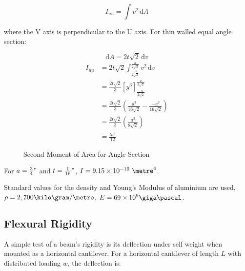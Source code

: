 \documentclass[12pt]{article} %
\begin{document}
\begin{appendices}
$$ I_{uu} = \int \! v^2 \, \mathrm{d}A $$

where the V axis is perpendicular to the U axis.  For thin walled equal angle
section:

$$ \mathrm{d}A = 2 t \sqrt{2} \, \mathrm{d}v $$
\begin{align*}
I_{uu} &= 2 t \sqrt{2} \int_{\frac{-a}{2\sqrt{2}}}^{\frac{a}{2\sqrt{2}}}
\! v^2 \, \mathrm{d}v \\
       &= \frac{2t\sqrt{2}}{3} \left[ y^3 \right]_{\frac{-a}{2\sqrt{2}}}
          ^{\frac{a}{2\sqrt{2}}} \\
       &= \frac{2t\sqrt{2}}{3} \left( \frac{a^3}{16\sqrt{2}} -
          \frac{-a^3}{16\sqrt{2}} \right) \\
       &= \frac{2t\sqrt{2}}{3} \left( \frac{a^3}{8\sqrt{2}} \right) \\
       &= \frac{ta^3}{12}
\end{align*}

\begin{figure}[h]
    \centering
    \caption{Second Moment of Area for Angle Section}
    \label{fig:iangle}
\end{figure}

For $a=\frac{3}{4}"$ and $t=\frac{1}{16}"$, $I = 9.15\times10^{-10}~\metre^4$.

Standard values for the density and Young's Modulus of aluminium are used,
$\rho=2,700\kilo\gram/\metre$, $E = 69 \times 10^9 \giga\pascal$.

\subsection{Flexural Rigidity}
A simple test of a beam's rigidity is its deflection under self weight when
mounted as a horizontal cantilever.  For a horizontal cantilever of length $L$
with distributed loading $w$, the deflection is:


\end{appendices}
\end{document}
